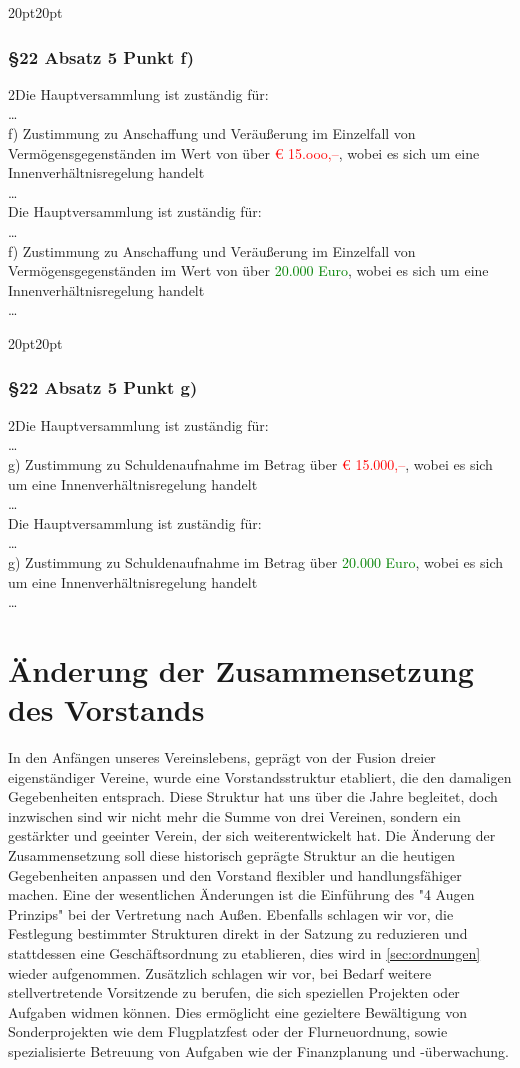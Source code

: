 \documentclass[10pt,a4paper,parskip=half]{scrartcl}
\newcommand{\new}[1]{\textcolor{Green}{#1}}
\newcommand{\old}[1]{\textcolor{Red}{#1}}
\newcommand{\change}[1]{
  \begin{adjustwidth}{20pt}{20pt}
    #1
  \end{adjustwidth}
}
\newcommand{\compare}[3]{\change{\subsubsection*{#1}\begin{multicols}{2}#2\columnbreak\\#3\end{multicols}}}
\begin{document}
  \compare{§22 Absatz 5 Punkt f)}
  {Die Hauptversammlung ist zuständig für: \\ \dots\\
    f) Zustimmung zu Anschaffung und Veräußerung im Einzelfall von Vermögensgegenständen im Wert von über \old{€ 15.ooo,--}, wobei es sich um eine Innenverhältnisregelung handelt\\\dots}
  {Die Hauptversammlung ist zuständig für: \\ \dots\\f) Zustimmung zu Anschaffung und Veräußerung im Einzelfall von Vermögensgegenständen im Wert von über \new{20.000 Euro}, wobei es sich um eine Innenverhältnisregelung handelt\\\dots}

  \compare{§22 Absatz 5 Punkt g)}
  {Die Hauptversammlung ist zuständig für: \\ \dots\\g) Zustimmung zu Schuldenaufnahme im Betrag über \old{€ 15.000,--}, wobei es sich um eine Innenverhältnisregelung handelt\\\dots}
  {Die Hauptversammlung ist zuständig für: \\ \dots\\g) Zustimmung zu Schuldenaufnahme im Betrag über \new{20.000 Euro}, wobei es sich um eine Innenverhältnisregelung handelt\\\dots}

  \clearpage
  \section{Änderung der Zusammensetzung des Vorstands}
  \label{sec:vorstand}
  In den Anfängen unseres Vereinslebens, geprägt von der Fusion dreier eigenständiger Vereine, wurde eine Vorstandsstruktur etabliert, die den damaligen Gegebenheiten entsprach. Diese Struktur hat uns über die Jahre begleitet, doch inzwischen sind wir nicht mehr die Summe von drei Vereinen, sondern ein gestärkter und geeinter Verein, der sich weiterentwickelt hat.
  Die Änderung der Zusammensetzung soll diese historisch geprägte Struktur an die heutigen Gegebenheiten anpassen und den Vorstand flexibler und handlungsfähiger machen. Eine der wesentlichen Änderungen ist die Einführung des "4 Augen Prinzips" bei der Vertretung nach Außen. Ebenfalls schlagen wir vor, die Festlegung bestimmter Strukturen direkt in der Satzung zu reduzieren und stattdessen eine Geschäftsordnung zu etablieren, dies wird in \autoref{sec:ordnungen} wieder aufgenommen. Zusätzlich schlagen wir vor, bei Bedarf weitere stellvertretende Vorsitzende zu berufen, die sich speziellen Projekten oder Aufgaben widmen können. Dies ermöglicht eine gezieltere Bewältigung von Sonderprojekten wie dem Flugplatzfest oder der Flurneuordnung, sowie spezialisierte Betreuung von Aufgaben wie der Finanzplanung und -überwachung. 
\end{document}

